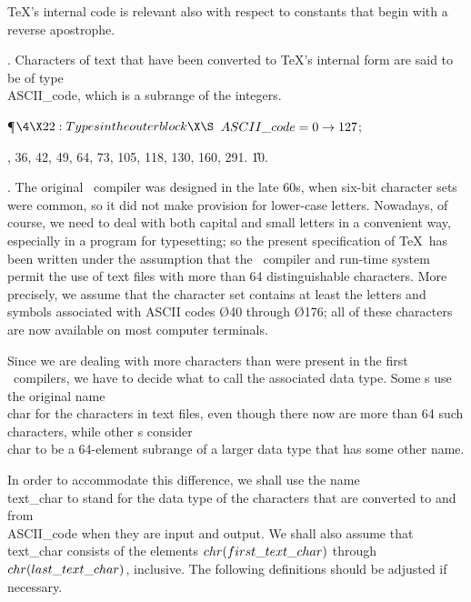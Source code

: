 \TeX's internal code is relevant also with respect to constants
that begin with a reverse apostrophe.


\fi

.
Characters of text that have been converted to \TeX's internal form
are said to be of type \\{ASCII\_code}, which is a subrange of the integers.

\Y\P$\4\X22:Types in the outer block\X\S$\6
$\\{ASCII\_code}=0\to127$;\par
{}, 36, 42, 49, 64, 73, 105, 118, 130, 160, 291.
\U10.\fi

.
The original \PASCAL\ compiler was designed in the late 60s, when six-bit
character sets were common, so it did not make provision for lower-case
letters. Nowadays, of course, we need to deal with both capital and small
letters in a convenient way, especially in a program for typesetting;
so the present specification of \TeX\ has been written under the assumption
that the \PASCAL\ compiler and run-time system permit the use of text files
with more than 64 distinguishable characters. More precisely, we assume that
the character set contains at least the letters and symbols associated
with ASCII codes \O{40} through \O{176}; all of these characters are now
available on most computer terminals.

Since we are dealing with more characters than were present in the first
\PASCAL\ compilers, we have to decide what to call the associated data
type. Some \PASCAL s use the original name \\{char} for the
characters in text files, even though there now are more than 64 such
characters, while other \PASCAL s consider \\{char} to be a 64-element
subrange of a larger data type that has some other name.

In order to accommodate this difference, we shall use the name \\{text\_char}
to stand for the data type of the characters that are converted to and
from \\{ASCII\_code} when they are input and output. We shall also assume
that \\{text\_char} consists of the elements $\\{chr}(\\{first\_text\_char})$
through
$\\{chr}(\\{last\_text\_char})$, inclusive. The following definitions should be
adjusted if necessary.

